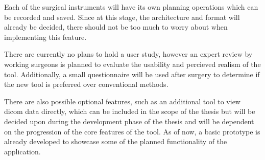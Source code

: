 Each of the surgical instruments will have its own planning operations which can be recorded and saved.
Since at this stage, the architecture and format will already be decided, there should not be too much to worry about when implementing this feature.

There are currently no plans to hold a user study, however an expert review by working surgeons is planned to evaluate the usability and percieved realism of the tool.
Additionally, a small questionnaire will be used after surgery to determine if the new tool is preferred over conventional methods.

There are also possible optional features, such as an additional tool to view dicom data directly, which can be included in the scope of the thesis but will be decided upon during the development phase of the thesis and will be dependent on the progression of the core features of the tool.
As of now, a basic prototype is already developed to showcase some of the planned functionality of the application.




